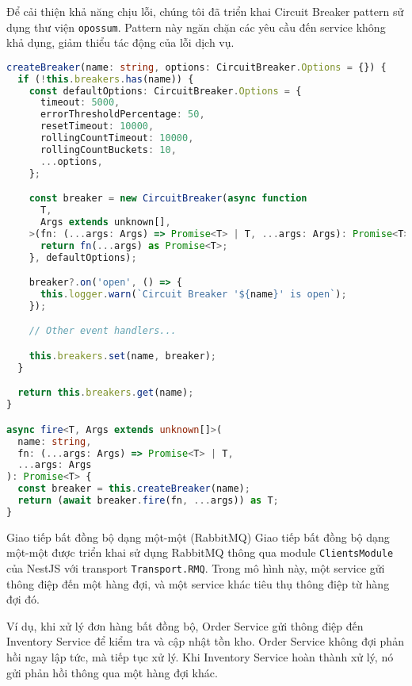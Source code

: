 Để cải thiện khả năng chịu lỗi, chúng tôi đã triển khai Circuit Breaker pattern sử dụng thư viện \texttt{opossum}. Pattern này ngăn chặn các yêu cầu đến service không khả dụng, giảm thiểu tác động của lỗi dịch vụ.

\begin{lstlisting}[language=Typescript]
createBreaker(name: string, options: CircuitBreaker.Options = {}) {
  if (!this.breakers.has(name)) {
    const defaultOptions: CircuitBreaker.Options = {
      timeout: 5000,
      errorThresholdPercentage: 50,
      resetTimeout: 10000,
      rollingCountTimeout: 10000,
      rollingCountBuckets: 10,
      ...options,
    };

    const breaker = new CircuitBreaker(async function 
      T,
      Args extends unknown[],
    >(fn: (...args: Args) => Promise<T> | T, ...args: Args): Promise<T> {
      return fn(...args) as Promise<T>;
    }, defaultOptions);

    breaker?.on('open', () => {
      this.logger.warn(`Circuit Breaker '${name}' is open`);
    });

    // Other event handlers...

    this.breakers.set(name, breaker);
  }

  return this.breakers.get(name);
}

async fire<T, Args extends unknown[]>(
  name: string,
  fn: (...args: Args) => Promise<T> | T,
  ...args: Args
): Promise<T> {
  const breaker = this.createBreaker(name);
  return (await breaker.fire(fn, ...args)) as T;
}
\end{lstlisting}

Giao tiếp bất đồng bộ dạng một-một (RabbitMQ)
Giao tiếp bất đồng bộ dạng một-một được triển khai sử dụng RabbitMQ thông qua module \texttt{ClientsModule} của NestJS với transport \texttt{Transport.RMQ}. Trong mô hình này, một service gửi thông điệp đến một hàng đợi, và một service khác tiêu thụ thông điệp từ hàng đợi đó.

Ví dụ, khi xử lý đơn hàng bất đồng bộ, Order Service gửi thông điệp đến Inventory Service để kiểm tra và cập nhật tồn kho. Order Service không đợi phản hồi ngay lập tức, mà tiếp tục xử lý. Khi Inventory Service hoàn thành xử lý, nó gửi phản hồi thông qua một hàng đợi khác.

